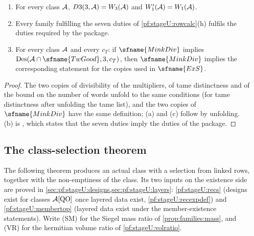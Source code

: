 \begin{lemma}\label{pf:stageU:frozen}
\begin{enumerate}[label=(\alph*)]
\item For every class $\mathcal{A}$, $D3(3,\mathcal{A})=W_3(\mathcal{A})$ and $W'_1(\mathcal{A})=W_1(\mathcal{A})$.
\item Every family fulfilling the seven duties of \cref{pf:stageU:rowcalc}(h) fulfils the duties required by the
package.
\item For every class $\mathcal{A}$ and every $c_T$: if $\sfname{MinkDiv}$ implies
$\stageUDes(\stageUA\cap\sfname{TwGood},3,c_T)$, then $\sfname{MinkDiv}$ implies the corresponding statement for the copies
used in $\sfname{ExS}$.
\end{enumerate}
\end{lemma}

\begin{proof}
The two copies of divisibility of the multipliers, of tame distinctness and of the bound on the number of words unfold to
the same conditions (for tame distinctness after unfolding the tame list), and the two copies of $\sfname{MinkDiv}$ have
the same definition; (a) and (c) follow by unfolding. (b) is , which
states that the seven duties imply the duties of the package.
\end{proof}

\subsection{The class-selection theorem}\label{sec:pf:stageU:classsel}

The following theorem produces an actual class with a selection from linked rows, together with the non-emptiness of
the class. Its two inputs on the existence side are proved in \cref{sec:pf:stageU:designs,sec:pf:stageU:layers}:
\cref{pf:stageU:recs} (designs exist for classes $\mathcal{A}[\mathrm{QO}]$ once layered data exist, \cref{pf:stageU:recexpdef})
and \cref{pf:stageU:membertop} (layered data exist under the member-existence statements). Write (SM) for the Siegel mass
ratio of \cref{prop:families:mass}, and (VR) for the hermitian volume ratio of \cref{pf:stageU:volratio}.


